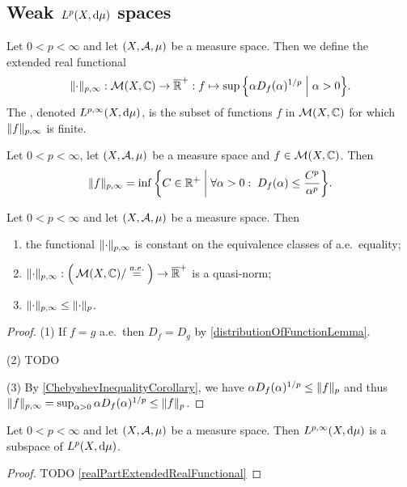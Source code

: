 \subsection{Weak $L^p(X,\operatorname{d \!}{\mu})$ spaces}
\begin{definition}
Let $0<p<\infty$ and let $\sSet{X,\mathcal{A}, \mu}$ be a measure space. Then we define the extended real functional
\[ \norm{\cdot}_{p,\infty}: \meas(X, \C)\to \overline{\R}^+: f\mapsto \sup\setbuilder{\alpha D_f(\alpha)^{1/p}}{\alpha > 0}. \]
The , denoted $L^{p,\infty}(X,\operatorname{d \!}{\mu})$, is the subset of functions $f$ in $\operatorname{\mathcal{M}}(X, \mathbb{C})$ for which $\lVert f\rVert_{p,\infty}$ is finite.
\end{definition}

\begin{lemma}
Let $0<p<\infty$, let $\sSet{X,\mathcal{A}, \mu}$ be a measure space and $f\in \operatorname{\mathcal{M}}(X, \mathbb{C})$. Then
\[ \norm{f}_{p,\infty} = \inf\setbuilder{C\in \R^+}{\forall \alpha>0: \; D_f(\alpha) \leq \frac{C^p}{\alpha^p}}. \]
\end{lemma}


\begin{proposition}
Let $0<p<\infty$ and let $\sSet{X,\mathcal{A}, \mu}$ be a measure space. Then
\begin{enumerate}
\item the functional $\lVert\cdot\rVert_{p,\infty}$ is constant on the equivalence classes of a.e.\ equality;
\item $\lVert\cdot\rVert_{p,\infty}: \Big(\operatorname{\mathcal{M}}(X, \mathbb{C})/\overset{a.e.}{=}\Big) \to \overline{\mathbb{R}}^+$ is a quasi-norm;
\item $\lVert\cdot\rVert_{p,\infty} \leq \lVert\cdot\rVert_{p}$.
\end{enumerate}
\end{proposition}
\begin{proof}
(1) If $f = g$ a.e.\ then $D_f = D_g$ by \ref{distributionOfFunctionLemma}.

(2) TODO

(3) By \ref{ChebyshevInequalityCorollary}, we have $\alpha D_f(\alpha)^{1/p} \leq \lVert f\rVert_p$ and thus $\lVert f\rVert_{p,\infty} = \sup_{\alpha > 0}\alpha D_f(\alpha)^{1/p} \leq \lVert f\rVert_p$.
\end{proof}
\begin{corollary}
Let $0<p<\infty$ and let $\sSet{X,\mathcal{A}, \mu}$ be a measure space. Then $L^{p,\infty}(X,\operatorname{d \!}{\mu})$ is a subspace of $L^{p}(X,\operatorname{d \!}{\mu})$.
\end{corollary}
\begin{proof}
TODO \ref{realPartExtendedRealFunctional}
\end{proof}

